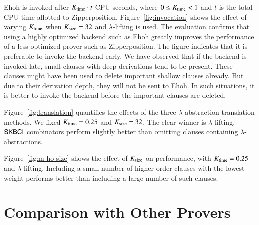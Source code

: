   Ehoh is invoked after $ K_\mathrm{time} \cdot t $ CPU seconds, where $0 \le K_\mathrm{time} < 1$ and $t$
  is the total CPU time allotted to Zipperposition. Figure~\ref{fig:invocation}
  shows the effect of varying $K_\mathrm{time}$ when $K_\mathrm{size} = 32$
  and $\lambda$-lifting is used. The evaluation confirms that using a highly
  optimized backend such as Ehoh greatly improves the performance of a
  less optimized prover such as Zipperposition.
  The figure indicates that it is preferable to invoke the backend early. We
  have observed that if the backend is invoked late, small clauses with
  deep derivations tend to be present. These clauses might have been
  used to delete important shallow clauses already. But due to their derivation
  depth, they will not be sent to Ehoh. In such situations, it is better to
  invoke the backend before the important clauses are deleted.

  Figure~\ref{fig:translation} quantifies the effects of the three
  $\lambda$-abstraction translation methods. We fixed $K_\mathrm{time} = 0.25$ and
  $K_\mathrm{size}=32$. The clear winner is $\lambda$-lifting.
  $\mathsf{SKBCI}$ combinators perform slightly better than omitting clauses
  containing $\lambda$-abstractions.

  Figure~\ref{fig:m-ho-size} shows the effect of $K_\mathrm{size}$ on
  performance, with $K_\mathrm{time} = 0.25$ and $\lambda$-lifting. Including a
  small number of higher-order clauses with the lowest weight performs better
  than including a large number of such clauses.

  \section{Comparison with Other Provers}
\label{sec:ho-tech:comparison}

